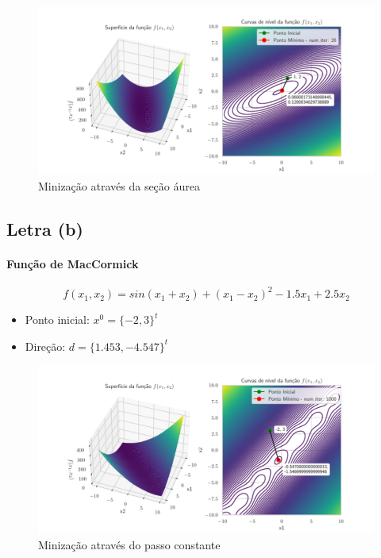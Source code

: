 \documentclass[12pt]{article}
\begin{document}
\begin{figure}[H]
    \centering
    \includegraphics[scale = 0.6]{figures/golden_section_2a.pdf}
    \caption{Minização através da seção áurea}
\end{figure}

\subsection*{Letra (b)}

\paragraph{Função de MacCormick}

\begin{equation}
    f(x_{1}, x_{2}) = sin(x_{1}+x_{2}) + (x_{1}-x_{2})^{2}-1.5x_{1}+2.5x_{2}
\end{equation}

\begin{itemize}
    \item Ponto inicial: $x^{0} = \{-2,3\}^{t}$
    \item Direção: $d = \{1.453, -4.547\}^{t}$
\end{itemize}

\begin{figure}[H]
    \centering
    \includegraphics[scale = 0.6]{figures/constant_step_2b.pdf}
    \caption{Minização através do passo constante}
\end{figure}
\end{document}
